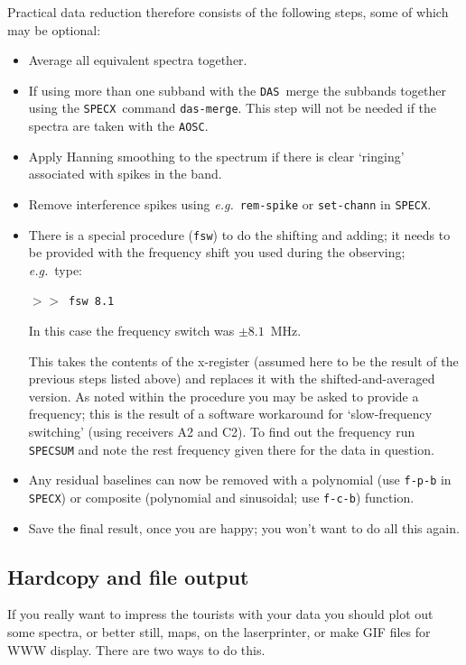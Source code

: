\documentclass[11pt,twoside]{starlink}
\providecommand{\eg}{\textit{e.g.}}
\providecommand{\SPECX}{\texttt{SPECX}}
\providecommand{\das}{\texttt{DAS}}
\providecommand{\aosc}{\texttt{AOSC}}
\providecommand{\SP}{{$>\!>$}}
\begin{document}
Practical data reduction therefore consists of the following steps,
some of which may be optional:
\begin{itemize}
\item
Average all equivalent spectra together.
\item
If using more than one subband with the \das\ merge the subbands
together using the \SPECX\ command \texttt{das-merge}. This step will not
be needed if the spectra are taken with the \aosc .
\item
Apply Hanning smoothing to the spectrum if there is clear `ringing'
associated with spikes in the band.
\item
Remove interference spikes using \eg\ \texttt{rem-spike} or \texttt{set-chann} in {\SPECX}.
\item
There is a special procedure ({\tt{fsw}}) to do the shifting and
adding; it needs to be provided with the frequency shift you used
during the observing; \eg\ type:

\SP\ \verb|fsw 8.1|

In this case the frequency switch was $\pm8.1$~MHz.

This takes the contents of the x-register (assumed here to be the
result of the previous steps listed above) and replaces it with the
shifted-and-averaged version. As noted within the procedure you may be
asked to provide a frequency; this is the result of a software
workaround for `slow-frequency switching' (using receivers A2 and
C2). To find out the frequency run \texttt{SPECSUM} and note the rest
frequency given there for the data in question.

\item
Any residual baselines can now be removed with a polynomial (use \texttt{f-p-b} in {\SPECX}) or composite (polynomial and sinusoidal; use \texttt{f-c-b}) function.
\item
Save the final result, once you are happy; you won't want to do all
this again.
\end{itemize}



\subsection{Hardcopy and file output}
\label{sec:specx_12}
If you really want to impress the tourists with your data you should
plot out some spectra, or better still, maps, on the laserprinter, or make
GIF files for WWW
display.  There are two ways to do this.
\end{document}
